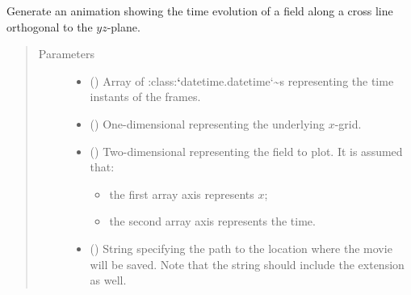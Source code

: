 \documentclass[letterpaper,10pt,english]{sphinxmanual}
\begin{document}

\begin{fulllineitems}
\label{\detokenize{api:tasmania.utils.utils_plot.animation_profile_x}}
Generate an animation showing the time evolution of a field along a cross line orthogonal
to the \(yz\)-plane.
\begin{quote}\begin{description}
\item[{Parameters}] \leavevmode\begin{itemize}
\item {} 
 () \textendash{} Array of :class:{\color{red}\bfseries{}{}`}datetime.datetime{}`\textasciitilde{}s representing the time instants of the frames.

\item {} 
 () \textendash{} One-dimensional  representing the underlying \(x\)-grid.

\item {} 
 () \textendash{} 
Two-dimensional  representing the field to plot.
It is assumed that:
\begin{itemize}
\item {} 
the first array axis represents \(x\);

\item {} 
the second array axis represents the time.

\end{itemize}


\item {} 
 () \textendash{} String specifying the path to the location where the movie will be saved.
Note that the string should include the extension as well.

\end{itemize}


\end{description}
\end{quote}
\end{fulllineitems}
\end{document}
